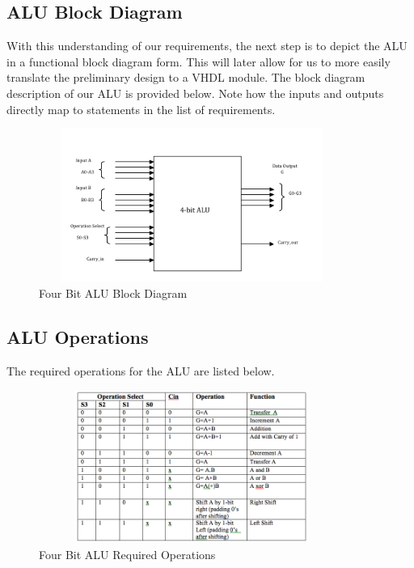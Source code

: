 \documentclass{article}
\begin{document}
\subsection{ALU Block Diagram}
With this understanding of our requirements, the next step is to depict the ALU in a functional block diagram form. This will later allow for us to more easily translate the preliminary design to a VHDL module. The block diagram description of our ALU is provided below. Note how the inputs and outputs directly map to statements in the list of requirements.
\begin{figure}[ht!]
\centering
\includegraphics[width=100mm, height=50mm]{images/BlockDiagramALU.png}
\caption{Four Bit ALU Block Diagram}
\label{overflow}
\end{figure}

\subsection{ALU Operations}
The required operations for the ALU are listed below.
\begin{figure}[ht!]
\centering
\includegraphics[width=100mm, height=50mm]{images/ALUOps.png}
\caption{Four Bit ALU Required Operations} 
\label{overflow}
\end{figure}



\end{document}
